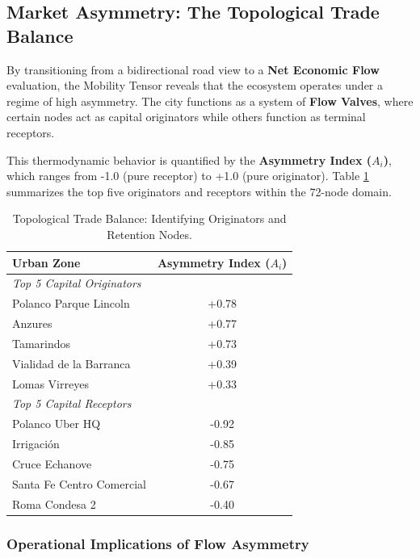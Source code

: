 \subsection{Market Asymmetry: The Topological Trade Balance}

By transitioning from a bidirectional road view to a \textbf{Net Economic Flow} evaluation, the Mobility Tensor reveals that the ecosystem operates under a regime of high asymmetry. The city functions as a system of \textbf{Flow Valves}, where certain nodes act as capital originators while others function as terminal receptors. 

This thermodynamic behavior is quantified by the \textbf{Asymmetry Index ($A_i$)}, which ranges from -1.0 (pure receptor) to +1.0 (pure originator). Table \ref{tab:trade_balance} summarizes the top five originators and receptors within the 72-node domain.

\begin{table}[H]
    \centering
    \small
    \begin{tabularx}{0.6\textwidth}{X c}
        \toprule
        \textbf{Urban Zone} & \textbf{Asymmetry Index ($A_i$)} \\
        \midrule
        \textit{Top 5 Capital Originators} & \\
        Polanco Parque Lincoln & +0.78 \\
        Anzures & +0.77 \\
        Tamarindos & +0.73 \\
        Vialidad de la Barranca & +0.39 \\
        Lomas Virreyes & +0.33 \\
        \addlinespace
        \midrule
        \addlinespace
        \textit{Top 5 Capital Receptors} & \\
        Polanco Uber HQ & -0.92 \\
        Irrigación & -0.85 \\
        Cruce Echanove & -0.75 \\
        Santa Fe Centro Comercial & -0.67 \\
        Roma Condesa 2 & -0.40 \\
        \bottomrule
    \end{tabularx}
    \caption{Topological Trade Balance: Identifying Originators and Retention Nodes.}
    \label{tab:trade_balance}
\end{table}

\subsubsection{Operational Implications of Flow Asymmetry}

